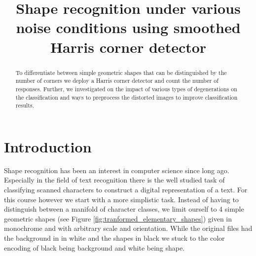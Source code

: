 \documentclass[conference]{IEEEtran}
\begin{document}
%
\title{Shape recognition under various noise conditions using smoothed Harris corner detector}


\author{
\and
{}
}


\maketitle


\begin{abstract}
To differentiate between simple geometric shapes that can be distinguished by the number
of corners we deploy a Harris corner detector\cite{Harris88acombined} and count
the number of responses. Further, we 
investigated on the impact of various types of degenerations on the classification and ways
to preprocess the distorted images to improve classification results.
\end{abstract}

\section{Introduction}
Shape recognition has been an interest in computer science since long ago. Especially in the
field of text recognition there is the well studied task of classifying scanned characters 
to construct a digital representation of a text. 
For this course however we start with a more simplistic task. Instead of having to
distinguish between a manifold of character classes, we limit ourself to 
4 simple geometric shapes (see Figure \ref{fig:tranformed_elementary_shapes}) given in monochrome and with arbitrary scale and orientation. While the original files had the 
background in in white and the shapes in black we stuck to the color encoding of black being
background and white being shape.
\end{document}
